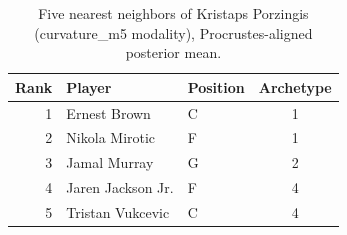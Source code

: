 \begin{table}[htbp]
  \centering\small
  \begin{tabular}{rllc}
    \toprule
    Rank & Player & Position & Archetype \\
    \midrule
    1 & Ernest Brown & C & 1 \\
    2 & Nikola Mirotic & F & 1 \\
    3 & Jamal Murray & G & 2 \\
    4 & Jaren Jackson Jr. & F & 4 \\
    5 & Tristan Vukcevic & C & 4 \\
    \bottomrule
  \end{tabular}
  \caption{Five nearest neighbors of Kristaps Porzingis (curvature_m5 modality), Procrustes-aligned posterior mean.}
  \label{tab:Kristaps_Porzingis_neighbors_curvature_m5}
\end{table}

